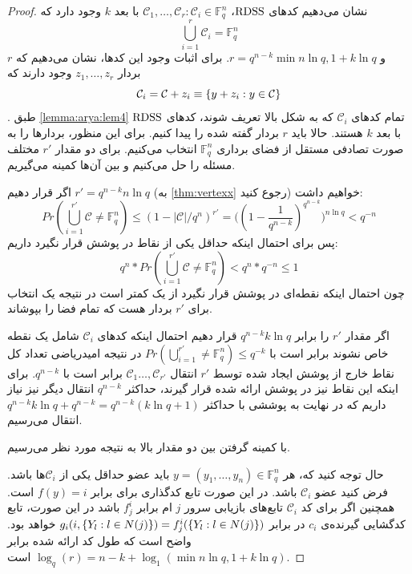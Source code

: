  \begin{proof}
 	نشان می‌دهیم کدهای
 	$\mathrm{RDSS}$،
 	$\mathcal{C}_1, \dots, \mathcal{C}_r: \mathcal{C}_i \in \mathbb{F}_q^n$
 	با بعد
 	$k$
 	وجود دارد که
 	\begin{equation}
 		\bigcup_{i = 1}^r \mathcal{C}_i = \mathbb{F}_q^n
 	\end{equation}
 	و 
 	$r = q^{n - k} \min{n \ln q, 1 + k \ln q}$.
 	برای اثبات وجود این کدها، نشان می‌دهیم که
 	$r$
 	بردار
 	$z_1, \dots, z_r$
 	وجود دارند که
 	\begin{equation}
 		\mathcal{C}_i = \mathcal{C} + z_i \equiv \left\{ y + z_i: y \in \mathcal{C} \right\}
 	\end{equation}.
 	طبق
 	\autoref{lemma:arya:lem4}
 	تمام کدهای
 	$\mathcal{C}_i$
 	که به شکل بالا تعریف شوند، کدهای
 	$\mathrm{RDSS}$
 	با بعد
 	$k$
 	هستند.	 حالا باید $r$ بردار گفته شده را پیدا کنیم. برای این منظور، بردارها را به صورت تصادفی مستقل از فضای برداری
 	$\mathbb{F}_q^n$
 	انتخاب می‌کنیم. برای دو مقدار 
 	$r'$
 	مختلف مسئله را حل می‌کنیم و بین آن‌ها کمینه می‌گیریم.
 	
 	 اگر قرار دهیم
 		$r' = q^{n - k} n \ln q $
 		(به
 		\autoref{thm:vertexx}
 		رجوع کنید)
 	خواهیم داشت:
 	$$Pr(\bigcup_{i = 1}^{r'} \mathcal{C} \ne \mathbb{F}_q^n) \leq  (1 - |\mathcal{C}|/q^n)^{r'}  = \big((1 - \dfrac{1}{q^{n - k}})^{q^{n - k}} \big)^{n \ln q} < q^{-n}$$
 	پس برای احتمال اینکه حداقل یکی از نقاط در پوشش قرار نگیرد داریم:
 	$$q^n * Pr(\bigcup_{i = 1}^{r'} \mathcal{C} \ne \mathbb{F}_q^n) < q^n * q^{-n} \leq 1$$
 	چون احتمال اینکه نقطه‌ای در پوشش قرار نگیرد از یک کمتر است در نتیجه یک انتخاب برای
 	$r'$
 	بردار هست که تمام فضا را بپوشاند.
 	
 	اگر مقدار
 	$r'$
 	را برابر
 	$q^{n - k} k \ln q$
 	قرار دهیم احتمال اینکه کدهای
 	$\mathcal{C}_i$
 	شامل یک نقطه خاص نشوند برابر است با
 	$Pr(\bigcup_{i = 1}^{r'} \ne \mathbb{F}_q^n) \leq q^{- k}$
 	در نتیجه امیدریاضی تعداد کل نقاط خارج از پوشش ایجاد شده توسط
 	$r'$
 	انتقال
 	$\mathcal{C}_1\ldots, \mathcal{C}_{r'}$
 	برابر است با
 	$q^{n - k}$.
 	برای اینکه این نقاط نیز در پوشش ارائه شده قرار گیرند، حداکثر 
 	$q^{n - k}$
 	 انتقال دیگر نیز نیاز داریم که در نهایت به پوششی با حداکثر
 	 $q^{n - k} k \ln q + q^{n - k} = q^{n - k}(k \ln q + 1)$
 	 انتقال می‌رسیم.
 	 
 	  	 با کمینه گرفتن بین دو مقدار بالا به نتیجه مورد نظر می‌رسیم.
 	 
 	 حال توجه کنید که، هر
 	 $y = (y_1, \dots, y_n) \in \mathbb{F}_q^n$
 	 باید عضو حداقل یکی از
 	 $\mathcal{C}_i$ها
 	 باشد. فرض کنید عضو
 	 $\mathcal{C}_i$
 	 باشد. در این صورت تابع کدگذاری برای
 	 \icod
 	 برابر
 	 $f(y) = i$
 	 است. همچنین اگر برای کد
 	 $\mathcal{C}_i$
 	  تابع‌های بازیابی سرور
 	  $j$
 	  ام برابر
 	 $f_j^i$
 	 باشد در این صورت، تابع کدگشایی گیرنده‌ی
 	 $c_i$
 	 در
 	 \icod
 	 برابر
 	 $g_i(i, \left\{ Y_l: l \in N(j) \right\}) = f_j^i(\left\{ Y_l: l \in N(j) \right\})$
 	 	خواهد بود.
 	 	واضح است که طول کد 
 	 	\icod
 	 	ارائه شده برابر
 	 	$\log_q(r) = n - k + \log_1(\min{n \ln q, 1 + k \ln q})$
 	 	است.
 \end{proof}
